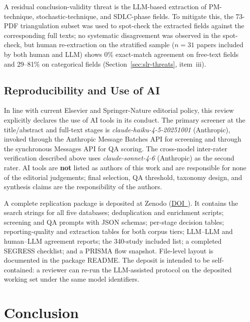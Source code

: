 

A residual conclusion-validity threat is the LLM-based extraction of
PM-technique, stochastic-technique, and SDLC-phase fields. To mitigate this,
the 73-PDF triangulation subset was used to spot-check the extracted fields
against the corresponding full texts; no systematic disagreement was
observed in the spot-check, but human re-extraction on the stratified sample
($n=31$ papers included by both human and LLM) shows 0\% exact-match
agreement on free-text fields and 29--81\% on categorical fields
(Section~\ref{sec:slr-threats}, item~iii).


\subsection{Reproducibility and Use of AI}
\label{sec:slr-replication}

In line with current Elsevier and Springer-Nature editorial policy, this
review explicitly declares the use of AI tools in its conduct. The primary
screener at the title/abstract and full-text stages is
\textit{claude-haiku-4-5-20251001} (Anthropic), invoked through the
Anthropic Message Batches API for screening and through the
synchronous Messages API for QA scoring. The cross-model
inter-rater verification described above uses
\textit{claude-sonnet-4-6} (Anthropic) as the second rater. AI tools are
\textbf{not} listed as authors of this work and are responsible for none of
the editorial judgements; final selection, QA threshold, taxonomy design,
and synthesis claims are the responsibility of the authors.

A complete replication package is deposited at Zenodo
(\href{\zenododoiurl}{DOI~\zenododoi}).
It contains the search strings for all five databases; deduplication and
enrichment scripts; screening and QA prompts with JSON schemas; per-stage
decision tables; reporting-quality and extraction tables for both corpus
tiers; LLM--LLM and human--LLM agreement reports; the 340-study included
list; a completed SEGRESS checklist; and a PRISMA flow snapshot.
File-level layout is documented in the package README. The deposit is
intended to be self-contained: a reviewer can re-run the LLM-assisted
protocol on the deposited working set under the same model identifiers.


\section{Conclusion}
\label{sec:slr-summary}


